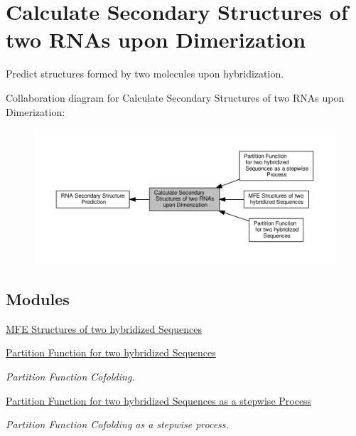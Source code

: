 \hypertarget{group__cofold}{}\section{Calculate Secondary Structures of two R\+N\+As upon Dimerization}
\label{group__cofold}


Predict structures formed by two molecules upon hybridization.  


Collaboration diagram for Calculate Secondary Structures of two R\+N\+As upon Dimerization\+:
\nopagebreak
\begin{figure}[H]
\begin{center}
\leavevmode
\includegraphics[width=350pt]{group__cofold}
\end{center}
\end{figure}
\subsection*{Modules}
\begin{DoxyCompactItemize}
\item 
\hyperlink{group__mfe__cofold}{M\+F\+E Structures of two hybridized Sequences}
\item 
\hyperlink{group__pf__cofold}{Partition Function for two hybridized Sequences}
\begin{DoxyCompactList}\small\item\em Partition Function Cofolding. \end{DoxyCompactList}\item 
\hyperlink{group__up__cofold}{Partition Function for two hybridized Sequences as a stepwise Process}
\begin{DoxyCompactList}\small\item\em Partition Function Cofolding as a stepwise process. \end{DoxyCompactList}\end{DoxyCompactItemize}


